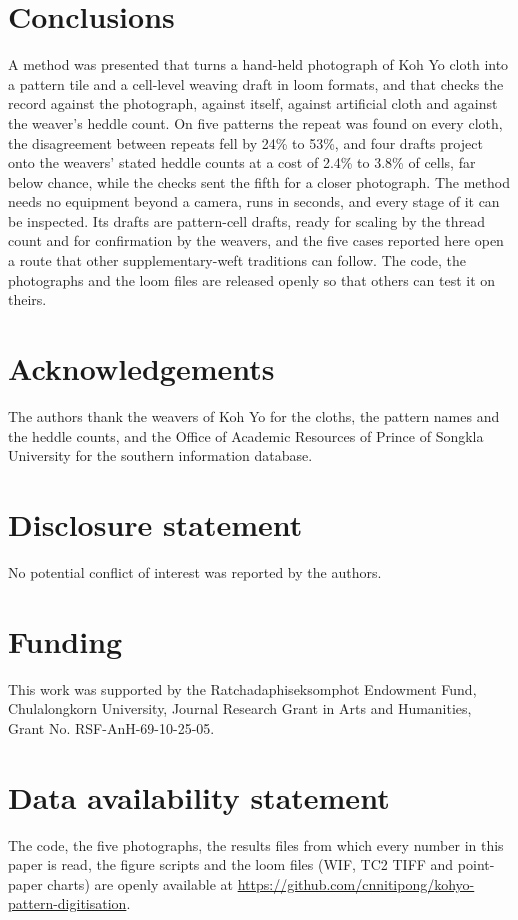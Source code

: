 \documentclass[12pt]{article}
\begin{document}
\section{Conclusions}

A method was presented that turns a hand-held photograph of Koh Yo cloth into a pattern tile and a cell-level weaving draft in loom formats, and that checks the record against the photograph, against itself, against artificial cloth and against the weaver's heddle count. On five patterns the repeat was found on every cloth, the disagreement between repeats fell by 24\% to 53\%, and four drafts project onto the weavers' stated heddle counts at a cost of 2.4\% to 3.8\% of cells, far below chance, while the checks sent the fifth for a closer photograph. The method needs no equipment beyond a camera, runs in seconds, and every stage of it can be inspected. Its drafts are pattern-cell drafts, ready for scaling by the thread count and for confirmation by the weavers, and the five cases reported here open a route that other supplementary-weft traditions can follow. The code, the photographs and the loom files are released openly so that others can test it on theirs.


\section{Acknowledgements}
The authors thank the weavers of Koh Yo for the cloths, the pattern names and the heddle counts, and the Office of Academic Resources of Prince of Songkla University for the southern information database.

\section{Disclosure statement}
No potential conflict of interest was reported by the authors.

\section{Funding}
\sloppy
This work was supported by the Ratchadaphiseksomphot Endowment Fund, Chulalongkorn University, Journal Research Grant in Arts and Humanities, Grant No. RSF-AnH-69-10-25-05.

\section{Data availability statement}
The code, the five photographs, the results files from which every number in this paper is read, the figure scripts and the loom files (WIF, TC2 TIFF and point-paper charts) are openly available at \url{https://github.com/cnnitipong/kohyo-pattern-digitisation}.



\end{document}

